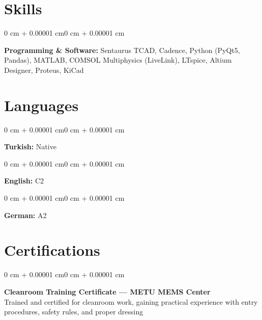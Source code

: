 \documentclass[10pt, letterpaper]{article}
\newenvironment{onecolentry}{
    \begin{adjustwidth}{0 cm + 0.00001 cm}{0 cm + 0.00001 cm}
}{
    \end{adjustwidth}
} %
\begin{document}
\section{Skills}

\begin{onecolentry}
    \textbf{Programming \& Software:} Sentaurus TCAD, Cadence, Python (PyQt5, Pandas), MATLAB, COMSOL Multiphysics (LiveLink), LTspice, Altium Designer, Proteus, KiCad
\end{onecolentry}


\section{Languages}

\begin{onecolentry}
  \textbf{Turkish:} Native
\end{onecolentry}

\vspace{0.15 cm}
\begin{onecolentry}
    \textbf{English:} C2
\end{onecolentry}

\vspace{0.15 cm}
\begin{onecolentry}
    \textbf{German:} A2
\end{onecolentry}

\section{Certifications}

\begin{onecolentry}
    \textbf{Cleanroom Training Certificate — METU MEMS Center}\\
    Trained and certified for cleanroom work, gaining practical experience with entry procedures, safety rules, and proper dressing 
\end{onecolentry}

\end{document}
